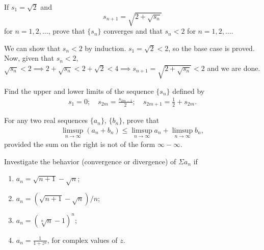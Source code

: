   \begin{exercise}[Rudin 3.3]
    If $s_1 = \sqrt{2}$ and 
    \begin{equation}
      s_{n+1} = \sqrt{2 + \sqrt{s_n}}
    \end{equation}
    for $n = 1, 2, \ldots$, prove that $\{s_n\}$ converges and that $s_n < 2$ for $n = 1, 2, \ldots$. 
  \end{exercise}
  \begin{solution}
    We can show that $s_n < 2$ by induction. $s_1 = \sqrt{2} < 2$, so the base case is proved. Now, given that $s_n < 2$, $\sqrt{s_n} < 2 \implies 2 + \sqrt{s_n} < 2 + \sqrt{2} < 4 \implies s_{n+1} = \sqrt{2 + \sqrt{s_n}} < 2$ and we are done. 
  \end{solution}

  \begin{exercise}[Rudin 3.4]
    Find the upper and lower limits of the sequence $\{s_n\}$ defined by
    \begin{align*}
      s_1 = 0; \quad s_{2m} = \frac{s_{2m-1}}{2}; \quad s_{2m+1} = \frac{1}{2} + s_{2m}.
    \end{align*}
  \end{exercise}
  \begin{solution}
    
  \end{solution}

  \begin{exercise}[Rudin 3.5]
    For any two real sequences $\{a_n\}$, $\{b_n\}$, prove that
    \begin{align*}
      \limsup_{n \to \infty} (a_n + b_n) \leq \limsup_{n \to \infty} a_n + \limsup_{n \to \infty} b_n,
    \end{align*}
    provided the sum on the right is not of the form $\infty - \infty$.
  \end{exercise}
  \begin{solution}
    
  \end{solution}

  \begin{exercise}[Rudin 3.6]
    Investigate the behavior (convergence or divergence) of $\Sigma a_n$ if
    \begin{enumerate} 
      \item[(a)] $a_n = \sqrt{n+1} - \sqrt{n}$;
      \item[(b)] $a_n = (\sqrt{n+1} - \sqrt{n})/n$;
      \item[(c)] $a_n = (\sqrt[n]{n} - 1)^n$;
      \item[(d)] $a_n = \frac{1}{1+z^n}$, for complex values of $z$.
    \end{enumerate}
  \end{exercise}
  \begin{solution}
    
  \end{solution}

